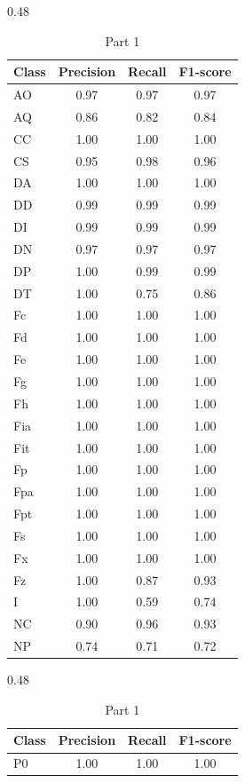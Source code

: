 \begin{table}[H]
\centering
\scriptsize

\begin{subtable}{0.48\textwidth}
\centering
\begin{tabular}{lccc}
\hline
\textbf{Class} & \textbf{Precision} & \textbf{Recall} & \textbf{F1-score} \\
\hline
AO  & 0.97 & 0.97 & 0.97 \\
AQ  & 0.86 & 0.82 & 0.84 \\
CC  & 1.00 & 1.00 & 1.00 \\
CS  & 0.95 & 0.98 & 0.96 \\
DA  & 1.00 & 1.00 & 1.00 \\
DD  & 0.99 & 0.99 & 0.99 \\
DI  & 0.99 & 0.99 & 0.99 \\
DN  & 0.97 & 0.97 & 0.97 \\
DP  & 1.00 & 0.99 & 0.99 \\
DT  & 1.00 & 0.75 & 0.86 \\
Fc  & 1.00 & 1.00 & 1.00 \\
Fd  & 1.00 & 1.00 & 1.00 \\
Fe  & 1.00 & 1.00 & 1.00 \\
Fg  & 1.00 & 1.00 & 1.00 \\
Fh  & 1.00 & 1.00 & 1.00 \\
Fia & 1.00 & 1.00 & 1.00 \\
Fit & 1.00 & 1.00 & 1.00 \\
Fp  & 1.00 & 1.00 & 1.00 \\
Fpa & 1.00 & 1.00 & 1.00 \\
Fpt & 1.00 & 1.00 & 1.00 \\
Fs  & 1.00 & 1.00 & 1.00 \\
Fx  & 1.00 & 1.00 & 1.00 \\
Fz  & 1.00 & 0.87 & 0.93 \\
I   & 1.00 & 0.59 & 0.74 \\
NC  & 0.90 & 0.96 & 0.93 \\
NP  & 0.74 & 0.71 & 0.72 \\
\hline
\end{tabular}
\caption{Part 1}
\end{subtable}
\hfill
\begin{subtable}{0.48\textwidth}
\centering
\begin{tabular}{lccc}
\hline
\textbf{Class} & \textbf{Precision} & \textbf{Recall} & \textbf{F1-score} \\
\hline
P0  & 1.00 & 1.00 & 1.00 \\

\end{tabular}
\end{subtable}
\end{table}
